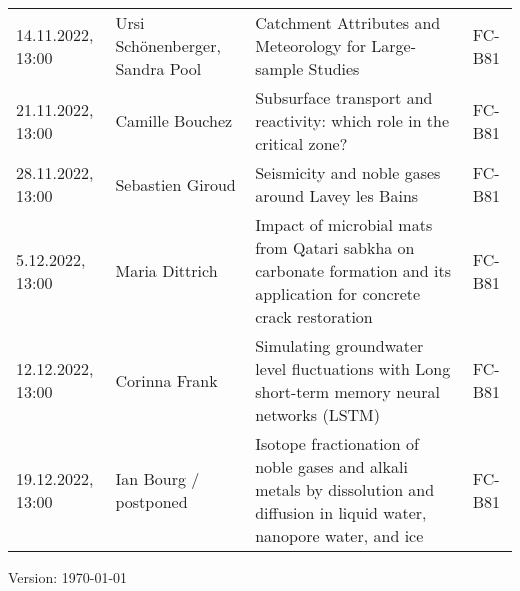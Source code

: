 \documentclass[12pt]{article}
\begin{document}
\begin{tabular}{l p{3.8cm} p{8.5cm} p{2cm}}
14.11.2022, 13:00
 	& Ursi Schönenberger, Sandra Pool
 	& Catchment Attributes and Meteorology for Large-sample Studies
 	& FC-B81\\

21.11.2022, 13:00
 	& Camille Bouchez
 	& Subsurface transport and reactivity: which role in the critical zone?
 	& FC-B81\\

28.11.2022, 13:00
 	& Sebastien Giroud
 	& Seismicity and noble gases around Lavey les Bains
 	& FC-B81\\

5.12.2022, 13:00
 	& Maria Dittrich
 	& Impact of microbial mats from Qatari sabkha on carbonate formation and its application for concrete crack restoration
 	& FC-B81\\

12.12.2022, 13:00
 	& Corinna Frank
 	& Simulating groundwater level fluctuations with Long short-term memory neural networks (LSTM)
 	& FC-B81\\

19.12.2022, 13:00
 	& Ian Bourg / postponed
 	& Isotope fractionation of noble gases and alkali metals by dissolution and diffusion in liquid water, nanopore water, and ice
 	& FC-B81\\


\end{tabular}

\vfill

{\scriptsize Version: \today}
\end{document}
